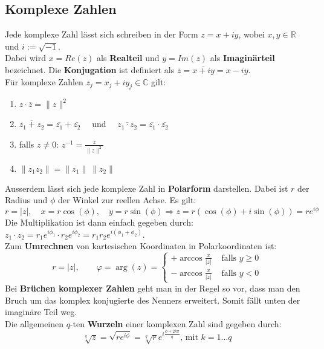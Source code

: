 \documentclass[a4paper,10pt]{scrartcl}
\begin{document}
\subsection{Komplexe Zahlen}
Jede komplexe Zahl lässt sich schreiben in der Form $z = x + iy$, wobei $x,y\in \mathbb{R}$ und $i:=\sqrt{-1}$.\\
Dabei wird $x=Re(z)$ als \textbf{Realteil} und $y=Im(z)$ als \textbf{Imaginärteil} bezeichnet.
Die \textbf{Konjugation} ist definiert als $\overline{z} = \overline{x+iy} = x -iy$. \\
Für komplexe Zahlen $z_j = x_j+iy_j \in \mathbb{C}$ gilt: 
\begin{enumerate}[label=$\circ$]
	\item $z\cdot \overline{z} = \|z\|^2$
	\item $\overline{z_1+z_2} = \overline{z_1} + \overline{z_2}\quad$ und $\quad  \overline{z_1\cdot z_2} = \overline{z_1} \cdot \overline{z_2}$
	\item falls $z\neq 0$: $z^{-1} = \frac{\overline{z}}{\|z\|^2}$
	\item $\|z_1z_2\| = \|z_1\|\ \|z_2\|$
\end{enumerate}
Ausserdem lässt sich jede komplexe Zahl in \textbf{Polarform} darstellen. Dabei ist $r$ der Radius und $\phi$ der Winkel zur reellen Achse. 
Es gilt: 
\begin{equation}
	r = |z|, \quad x= r\cos (\phi), \quad y = r\sin(\phi) \Rightarrow 
	z = r(\cos(\phi) + i\sin(\phi)) = re^{i\phi}
\end{equation}
Die Multiplikation ist dann einfach gegeben durch: $z_1\cdot z_2 = r_1e^{i\phi_1}\cdot r_2e^{i\phi_2} = r_1r_2e^{i(\phi_1 + \phi_2)}$.\\
Zum \textbf{Umrechnen} von kartesischen Koordinaten in Polarkoordinaten ist:
\begin{equation*}
	r=|z|, \qquad 
	\varphi =\arg(z)=
			\begin{cases}
				+\arccos\frac{x}{|z|} & \text{ falls } y\geq 0\\
				-\arccos\frac{x}{|z|} & \text{ falls } y<0
			\end{cases}
\end{equation*}
Bei \textbf{Brüchen komplexer Zahlen} geht man in der Regel so vor, dass man den Bruch um das komplex konjugierte des Nenners erweitert. Somit fällt unten der imaginäre Teil weg. \\
Die allgemeinen $q$-ten \textbf{Wurzeln} einer komplexen Zahl sind gegeben durch:\\
\begin{equation}
\sqrt[q]{z}= \sqrt{re^{i\phi}} = \sqrt[q]{r} e^{i\frac{\phi + 2k\pi}{q}} \text{, mit } k=1\dots q
\end{equation}
\end{document}
